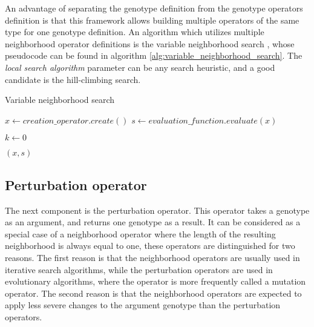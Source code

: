 An advantage of separating the genotype definition from the genotype operators definition is that this framework allows building multiple operators of the same type for one genotype definition. An algorithm which utilizes multiple neighborhood operator definitions is the variable neighborhood search \citep{variable_neighborhood_search}, whose pseudocode can be found in algorithm \ref{alg:variable_neighborhood_search}. The \textit{local search algorithm} parameter can be any search heuristic, and a good candidate is the hill-climbing search.

\begin{algorithm}[!htbp]
    \caption{Variable neighborhood search}
    \label{alg:variable_neighborhood_search}

    $x \gets creation\_operator.create()$\;
    $s \gets evaluation\_function.evaluate(x)$\;

     {

        $k \gets 0$\;
    }

    \Return $(x, s)$\;
    \end{algorithm}

\subsection{Perturbation operator}
\label{sec:perturbation_operator}

The next component is the perturbation operator. This operator takes a genotype as an argument, and returns one genotype as a result. It can be considered as a special case of a neighborhood operator where the length of the resulting neighborhood is always equal to one, these operators are distinguished for two reasons. The first reason is that the neighborhood operators are usually used in iterative search algorithms, while the perturbation operators are used in evolutionary algorithms, where the operator is more frequently called a mutation operator. The second reason is that the neighborhood operators are expected to apply less severe changes to the argument genotype than the perturbation operators. 

